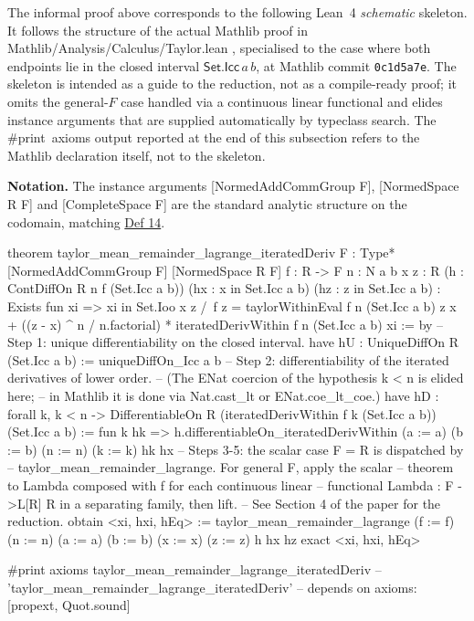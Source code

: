 \documentclass[11pt,reqno]{amsart}
\begin{document}
\label{sec:lean-skeleton}

\noindent The informal proof above corresponds to the following Lean~4 \emph{%
schematic} skeleton. It follows the structure of the actual Mathlib proof in 
\textsf{Mathlib/Analysis/Calculus/Taylor.lean} \cite{mathlib4-taylor},
specialised to the case where both endpoints lie in the closed interval $%
\mathsf{Set.Icc}\,a\,b$, at Mathlib commit \texttt{0c1d5a7e}{}. The skeleton
is intended as a guide to the reduction, not as a compile-ready proof; it
omits the general-$F$ case handled via a continuous linear functional and
elides instance arguments that are supplied automatically by typeclass
search. The \textsf{\#print\ axioms} output reported at the end of this
subsection refers to the Mathlib declaration itself, not to the skeleton.

\noindent\textbf{Notation.} The instance arguments \textsf{%
[NormedAddCommGroup F]}, \textsf{[NormedSpace R F]} and \textsf{%
[CompleteSpace F]} are the standard analytic structure on the codomain,
matching \hyperlink{def:NACGM}{Def 14}.

\text{ \ } \text{ \ } 
\begin{verbatimbox}
theorem
  taylor_mean_remainder_lagrange_iteratedDeriv
    {F : Type*} [NormedAddCommGroup F] [NormedSpace R F]
    {f : R -> F} {n : N} {a b x z : R}
    (h : ContDiffOn R n f (Set.Icc a b))
    (hx : x in Set.Icc a b) (hz : z in Set.Icc a b) :
    Exists fun xi =>
      xi in Set.Ioo x z /\
      f z
        = taylorWithinEval f n (Set.Icc a b) z x
          + ((z - x) ^ n / n.factorial) *
              iteratedDerivWithin f n (Set.Icc a b) xi := by
  -- Step 1: unique differentiability on the closed interval.
  have hU : UniqueDiffOn R (Set.Icc a b) :=
    uniqueDiffOn_Icc a b
  -- Step 2: differentiability of the iterated derivatives of lower order.
  --   (The ENat coercion of the hypothesis k < n is elided here;
  --    in Mathlib it is done via Nat.cast_lt or ENat.coe_lt_coe.)
  have hD : forall k, k < n ->
      DifferentiableOn R
        (iteratedDerivWithin f k (Set.Icc a b)) (Set.Icc a b) :=
    fun k hk =>
      h.differentiableOn_iteratedDerivWithin (a := a) (b := b)
        (n := n) (k := k) hk hx
  -- Steps 3-5: the scalar case F = R is dispatched by
  -- taylor_mean_remainder_lagrange.  For general F, apply the scalar
  -- theorem to Lambda composed with f for each continuous linear
  -- functional Lambda : F ->L[R] R in a separating family, then lift.
  -- See Section 4 of the paper for the reduction.
  obtain <xi, hxi, hEq> :=
    taylor_mean_remainder_lagrange
      (f := f) (n := n) (a := a) (b := b) (x := x) (z := z)
      h hx hz
  exact <xi, hxi, hEq>

#print axioms
  taylor_mean_remainder_lagrange_iteratedDeriv
-- 'taylor_mean_remainder_lagrange_iteratedDeriv'
--   depends on axioms: [propext, Quot.sound]
\end{verbatimbox}
\text{ \ } \text{ \ }
\end{document}
